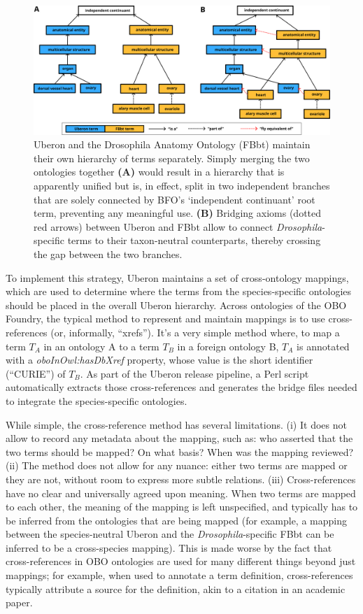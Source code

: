 \documentclass{ceurart}
\def\species#1{\textit{#1}}
\def\term#1{`#1'}
\def\property#1{\textit{#1}}
\begin{document}
\begin{figure}
  \centering
  \includegraphics[width=\linewidth]{figs/bridges}
  \caption{Uberon and the Drosophila Anatomy Ontology (FBbt) maintain
  their own hierarchy of terms separately. Simply merging the two
  ontologies together \textbf{(A)} would result in a hierarchy that is
  apparently unified but is, in effect, split in two independent
  branches that are solely connected by BFO's \term{independent
  continuant} root term, preventing any meaningful use. \textbf{(B)}
  Bridging axioms (dotted red arrows) between Uberon and FBbt allow to
  connect \species{Drosophila}-specific terms to their taxon-neutral
  counterparts, thereby crossing the gap between the two branches.}
  \label{fig:bridges}
\end{figure}

To implement this strategy, Uberon maintains a set of cross-ontology
mappings, which are used to determine where the terms from the
species-specific ontologies should be placed in the overall Uberon
hierarchy. Across ontologies of the OBO Foundry, the typical method to
represent and maintain mappings is to use cross-references (or,
informally, ``xrefs''). It’s a very simple method where, to map a term
$T_A$ in an ontology A to a term $T_B$ in a foreign ontology B, $T_A$ is
annotated with a \property{oboInOwl:hasDbXref} property, whose value is
the short identifier (``CURIE'') of $T_B$. As part of the Uberon release
pipeline, a Perl script automatically extracts those cross-references
and generates the bridge files needed to integrate the species-specific
ontologies.

While simple, the cross-reference method has several limitations. (i) It
does not allow to record any metadata about the mapping, such as: who
asserted that the two terms should be mapped? On what basis? When was
the mapping reviewed?  (ii) The method does not allow for any nuance:
either two terms are mapped or they are not, without room to express
more subtle relations. (iii) Cross-references have no clear and
universally agreed upon meaning. When two terms are mapped to each
other, the meaning of the mapping is left unspecified, and typically has
to be inferred from the ontologies that are being mapped (for example, a
mapping between the species-neutral Uberon and the
\species{Drosophila}-specific FBbt can be inferred to be a cross-species
mapping). This is made worse by the fact that cross-references in OBO
ontologies are used for many different things beyond just mappings; for
example, when used to annotate a term definition, cross-references
typically attribute a source for the definition, akin to a citation in
an academic paper.
\end{document}
